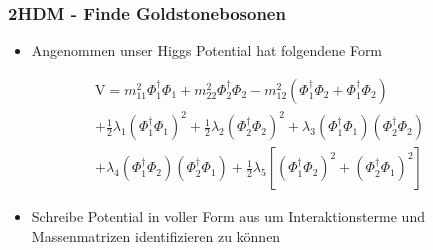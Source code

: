 \documentclass[xcolor=dvipsnames]{beamer}
\begin{document}
\begin{frame}[t]
\frametitle{2HDM - Finde Goldstonebosonen}
\begin{itemize}
\item Angenommen unser Higgs Potential hat folgendene Form
\end{itemize}
\begin{equation*}
\begin{split}
\text{V}=m_{11}^{2} \Phi_{1}^{\dagger}\Phi_{1}+m_{22}^{2} \Phi_{2}^{\dagger}\Phi_{2} -m_{12}^{2}( \Phi_{1}^{\dagger}\Phi_{2} +\Phi_{1}^{\dagger}\Phi_{2}) \\+ \frac{1}{2} \lambda_{1} (\Phi_{1}^{\dagger}\Phi_{1})^{2}+ \frac{1}{2} \lambda_{2} (\Phi_{2}^{\dagger}\Phi_{2})^{2}+ \lambda_{3}( \Phi_{1}^{\dagger}\Phi_{1})(\Phi_{2}^{\dagger}\Phi_{2} ) \\+\lambda_{4}( \Phi_{1}^{\dagger}\Phi_{2})(\Phi_{2}^{\dagger}\Phi_{1} ) +\frac{1}{2} \lambda_{5}[( \Phi_{1}^{\dagger}\Phi_{2})^{2}+(\Phi_{2}^{\dagger}\Phi_{1} )^{2}]
\end{split}
\end{equation*}
\begin{itemize}
\item Schreibe Potential in voller Form aus um Interaktionsterme und Massenmatrizen identifizieren zu können 
\end{itemize} 
\end{frame}
\end{document}
